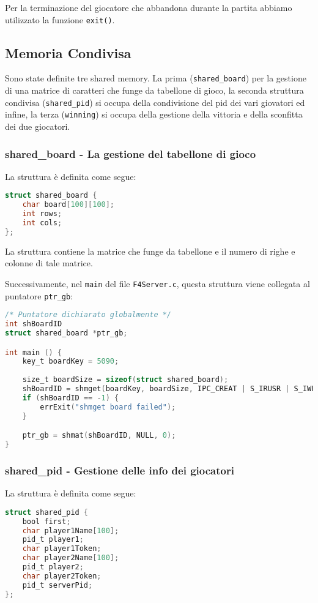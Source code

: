 \documentclass[a4paper,11pt]{article}
\begin{document}
Per la terminazione del giocatore che abbandona durante la partita abbiamo utilizzato la funzione \texttt{exit()}.

\subsection{Memoria Condivisa}

Sono state definite tre shared memory. La prima (\texttt{shared\_board}) per la gestione di una matrice di caratteri che funge da tabellone di gioco, la seconda struttura condivisa (\texttt{shared\_pid}) si occupa della condivisione del pid dei vari giovatori ed infine, la terza (\texttt{winning}) si occupa della gestione della vittoria e della sconfitta dei due giocatori.

\subsubsection*{shared\_board - La gestione del tabellone di gioco}

La struttura \`e definita come segue:
\begin{lstlisting}[language=C]
struct shared_board {
	char board[100][100];
	int rows; 
	int cols;
};
\end{lstlisting}

La struttura contiene la matrice che funge da tabellone e il numero di righe e colonne di tale matrice. 

Successivamente, nel \texttt{main} del file \texttt{F4Server.c}, questa struttura viene collegata al puntatore \texttt{ptr\_gb}:

\begin{lstlisting}[language=C]
/* Puntatore dichiarato globalmente */
int shBoardID
struct shared_board *ptr_gb;

int main () {
	key_t boardKey = 5090;
	
	size_t boardSize = sizeof(struct shared_board);
	shBoardID = shmget(boardKey, boardSize, IPC_CREAT | S_IRUSR | S_IWUSR);
	if (shBoardID == -1) {
		errExit("shmget board failed");
	}

	ptr_gb = shmat(shBoardID, NULL, 0);
}
\end{lstlisting}

\subsubsection*{shared\_pid - Gestione delle info dei giocatori}

La struttura \`e definita come segue:
\begin{lstlisting}[language=C]
struct shared_pid {
	bool first;
	char player1Name[100];
	pid_t player1;
	char player1Token;
	char player2Name[100];
	pid_t player2;
	char player2Token;
	pid_t serverPid;
};
\end{lstlisting}
\end{document}
